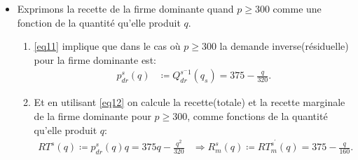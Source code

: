 \begin{frame}
\begin{itemize}
\begin{align}
\begin{array}{ll}
60000 - 120p & \text{sinon}.
\end{array}\right.
\label{eq11}
\end{align}
\item Exprimons la recette de la firme dominante quand $p\geq 300$ comme une fonction de la quantité qu'elle produit $q$.
\begin{enumerate}[$\cdot$]
   \item \eqref{eq11}  implique que dans le cas où $p\geq 300$ la demande inverse(résiduelle) pour la firme dominante est:
   \begin{align}
   p_{dr}^s(q) &\coloneqq Q_{dr}^{s^-1}(q_s) = 375 - \frac{q}{320}\label{eq12}.
   \end{align} 
   \item Et en utilisant \eqref{eq12} on calcule la recette(totale) et  la recette marginale de la firme dominante pour $p\geq 300$, comme fonctions de la quantité qu'elle produit $q$:
   \begin{align}
   RT^s(q) \coloneqq  p_{dr}^s(q)q = 375q - \frac{q^2}{320}&\Rightarrow R^s_m(q) \coloneqq RT_m^{s^\prime}(q) = 375-  \frac{q}{160}.
   \label{eq13}
   \end{align}
\end{enumerate}
   \end{itemize}
 \end{frame}
 
